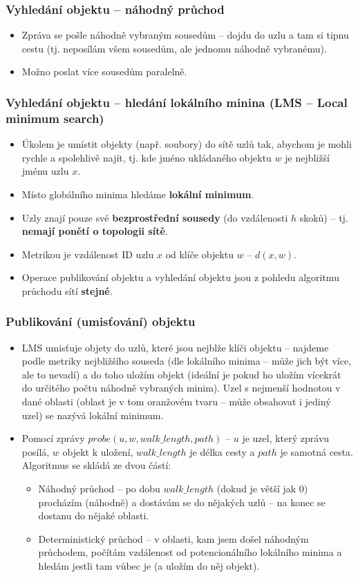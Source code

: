 \documentclass[11pt,a4paper]{article}
\begin{document}
\subsubsection{Vyhledání objektu -- náhodný průchod}
\begin{itemize}
\item Zpráva se pošle náhodně vybraným sousedům -- dojdu do uzlu a tam si tipnu cestu (tj. neposílám všem sousedům, ale jednomu náhodně vybranému).
\item Možno poslat více sousedům paralelně.
\end{itemize}

\subsubsection{Vyhledání objektu -- hledání lokálního minina (LMS -- Local minimum search)}
\begin{itemize}
\item Úkolem je umístit objekty (např. soubory) do sítě uzlů tak, abychom je mohli rychle a spolehlivě najít, tj. kde jméno ukládaného objektu $w$ je nejbližší jménu uzlu $x$.
\item Místo globálního minima hledáme \textbf{lokální minimum}.
\item Uzly znají pouze své\textbf{ bezprostřední sousedy} (do vzdálenosti $h$ skoků) -- tj. \textbf{nemají ponětí o topologii sítě}.
\item Metrikou je vzdálenost ID uzlu $x$ od klíče objektu $w$ -- $d(x,w)$.
\item Operace publikování objektu a vyhledání objektu jsou z pohledu algoritmu průchodu sítí \textbf{stejné}.
\end{itemize}
\subsubsection*{Publikování (umisťování) objektu}
\begin{itemize}
\item LMS umisťuje objety do uzlů, které jsou nejblže klíči objektu -- najdeme podle metriky nejbližšího souseda (dle lokálního minima -- může jich být více, ale to nevadí) a do toho uložím objekt (ideální je pokud ho uložím vícekrát do určitého počtu náhodně vybraných minim). Uzel s nejmenší hodnotou v dané oblasti (oblast je v tom oranžovém tvaru -- může obsahovat i jediný uzel) se nazývá lokální minimum.
\item Pomocí zprávy $probe(u,w,walk\_length,path)$ -- $u$ je uzel, který zprávu posílá, $w$ objekt k uložení, $walk\_length$ je délka cesty a $path$ je samotná cesta. Algoritmus se skládá ze dvou částí:
\begin{itemize}
\item Náhodný průchod -- po dobu $walk\_length$ (dokud je větší jak 0) procházím (náhodně) a dostávám se do nějakých uzlů -- na konec se dostanu do nějaké oblasti.
\item Deterministický průchod -- v oblasti, kam jsem došel náhodným průchodem, počítám vzdálenost od potencionálního lokálního minima a hledám jestli tam vůbec je (a uložím do něj objekt).
\end{itemize}
\end{itemize}
\end{document}
